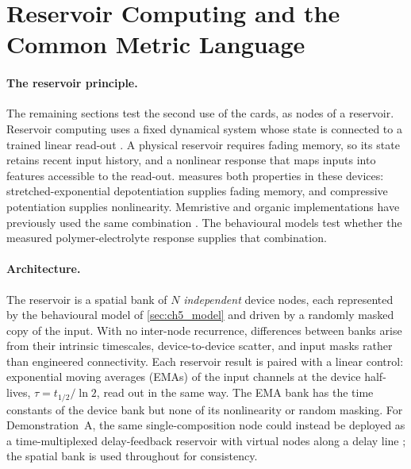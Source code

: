 \documentclass[12pt, twoside]{report}
\begin{document}
\section{Reservoir Computing and the Common Metric Language}\label{sec:ch5_framework}

\paragraph{The reservoir principle.} The remaining sections test the second use of the cards, as nodes of a reservoir. Reservoir computing uses a fixed dynamical system whose state is connected to a trained linear read-out \cite{Jaeger2001ESN,Maass2002LSM,LukoseviciusJaeger2009}. A physical reservoir requires fading memory, so its state retains recent input history, and a nonlinear response that maps inputs into features accessible to the read-out.  measures both properties in these devices: stretched-exponential depotentiation supplies fading memory, and compressive potentiation supplies nonlinearity. Memristive and organic implementations have previously used the same combination \cite{Tanaka2019,Du2017,Zhong2021,Cucchi2021}. The behavioural models test whether the measured polymer-electrolyte response supplies that combination.

\paragraph{Architecture.} The reservoir is a spatial bank of $N$ \emph{independent} device nodes, each represented by the behavioural model of \cref{sec:ch5_model} and driven by a randomly masked copy of the input. With no inter-node recurrence, differences between banks arise from their intrinsic timescales, device-to-device scatter, and input masks rather than engineered connectivity. Each reservoir result is paired with a linear control: exponential moving averages (EMAs) of the input channels at the device half-lives, $\tau=t_{1/2}/\ln 2$, read out in the same way. The EMA bank has the time constants of the device bank but none of its nonlinearity or random masking. For Demonstration~A, the same single-composition node could instead be deployed as a time-multiplexed delay-feedback reservoir with virtual nodes along a delay line \cite{Appeltant2011}; the spatial bank is used throughout for consistency.
\end{document}
